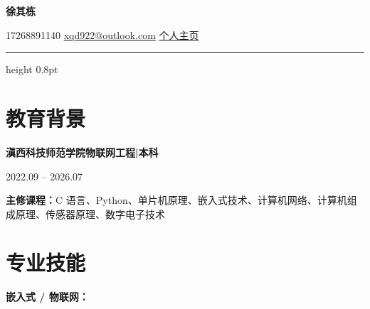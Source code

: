 \documentclass[10pt,a4paper]{article}
\begin{document}
\begin{center}
    {\fontsize{24}{28}\selectfont\bfseries\color{primary} 徐其栋}

    \vspace{0.1em}

    {\color{graytext}
    \faPhone\hspace{0.3em}17268891140
    \hspace{1.2em}
    \faEnvelope\hspace{0.3em}\href{mailto:xqd922@outlook.com}{xqd922@outlook.com}
    \hspace{1.2em}
    \faGlobe\hspace{0.3em}\href{https://1001.pp.ua}{个人主页}}

\end{center}

\vspace{0.2em}
{\color{rulecolor}\hrule height 0.8pt}

\section{\faGraduationCap\hspace{0.4em}教育背景}

{\bfseries 滇西科技师范学院}\hfill{\bfseries 物联网工程\hspace{0.3em}|\hspace{0.3em}本科}

{\color{graytext} 2022.09 -- 2026.07}

\vspace{0.2em}

{\color{darktext}\textbf{主修课程：}C 语言、Python、单片机原理、嵌入式技术、计算机网络、计算机组成原理、传感器原理、数字电子技术}

\section{\faCogs\hspace{0.4em}专业技能}

{\bfseries\color{primary}嵌入式 / 物联网：}

\vspace{2pt}
\end{document}
